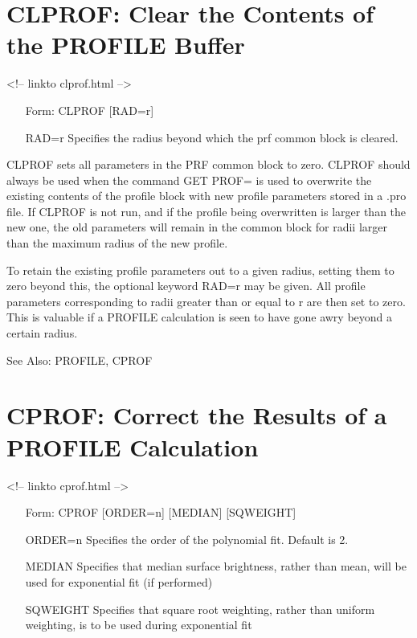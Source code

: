 \section{CLPROF: Clear the Contents of the PROFILE Buffer}
\begin{rawhtml}
<!-- linkto clprof.html -->
\end{rawhtml}
\begin{itemize}
  \item[Form: CLPROF {[RAD=r]}\hfill]{}
  \item[RAD=r]{Specifies the radius beyond which the prf common
       block is cleared.}
\end{itemize}

CLPROF sets all parameters in the PRF common block to zero. CLPROF should
always be used when the command GET PROF= is used to overwrite the existing
contents of the profile block with new profile parameters stored in a .pro
file. If CLPROF is not run, and if the profile being overwritten is larger
than the new one, the old parameters will remain in the common block for
radii larger than the maximum radius of the new profile.

To retain the existing profile parameters out to a given radius, setting
them to zero beyond this, the optional keyword RAD=r may be given. All
profile parameters corresponding to radii greater than or equal to r are
then set to zero. This is valuable if a PROFILE calculation is seen to have
gone awry beyond a certain radius.

See Also: PROFILE, CPROF


\section{CPROF: Correct the Results of a PROFILE Calculation}
\begin{rawhtml}
<!-- linkto cprof.html -->
\end{rawhtml}
\begin{itemize}
  \item[Form: CPROF {[ORDER=n]} {[MEDIAN]} {[SQWEIGHT]}\hfill]{}
  \item[ORDER=n]{Specifies the order of the polynomial fit. Default is 2.}
  \item[MEDIAN]{Specifies that median surface brightness, rather
       than mean, will be used for exponential fit (if performed)}
  \item[SQWEIGHT]{Specifies that square root weighting, rather than 
       uniform weighting, is to be used during exponential fit}
\end{itemize}

